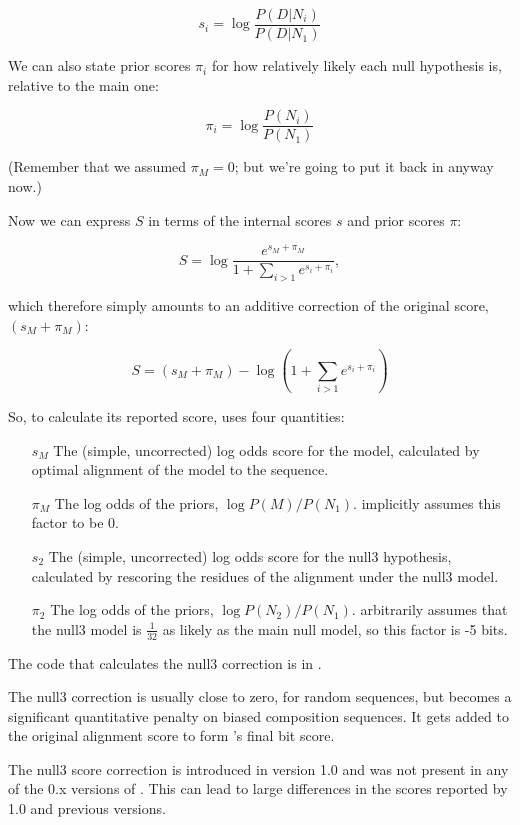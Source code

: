 \[
  s_i = \log \frac{P(D | N_i)}{P(D | N_1)}
\]

We can also state prior scores $\pi_i$ for how relatively likely
each null hypothesis is, relative to the main one:

\[
  \pi_i = \log \frac{P(N_i)}{P(N_1)}
\]

(Remember that we assumed $\pi_M = 0$; but we're going to put it back
in anyway now.)

Now we can express $S$ in terms of the internal scores $s$ and
prior scores $\pi$:

\[
   S = \log  \frac{e^{s_M + \pi_M}} { 1 + \sum_{i>1} e^{s_i + \pi_i}},
\]

which therefore simply amounts to an additive correction of the
original score, $(s_M + \pi_M)$:

\[
  S = (s_M + \pi_M) - \log \left( 1 + \sum_{i>1} e^{s_i + \pi_i} \right)
\]

So, to calculate its reported score,  uses four quantities:

\begin{enumerate}
\item [$s_M$] The (simple, uncorrected) log odds score for the model,
calculated by optimal alignment of the model to the sequence.

\item [$\pi_M$] The log odds of the priors, $\log P(M)/P(N_1)$. 
   implicitly assumes this factor to be 0.

\item [$s_2$] The (simple, uncorrected) log odds score
   for the null3 hypothesis, calculated by rescoring the residues
   of the alignment under the null3 model.

\item [$\pi_2$] The log odds of the priors, $\log P(N_2)/P(N_1)$. 
 arbitrarily assumes that the null3 model is
$\frac{1}{32}$ as likely as the main null model, so this factor
is -5 bits.
\end{enumerate}

The code that calculates the null3 correction is in 
.

The null3 correction is usually close to zero, for random sequences,
but becomes a significant quantitative penalty on biased composition
sequences.  It gets added to the original alignment score to form
's final bit score.

The null3 score correction is introduced in version 1.0 and was not
present in any of the 0.x versions of . This can
lead to large differences in the scores reported by 1.0 and previous
versions. 

